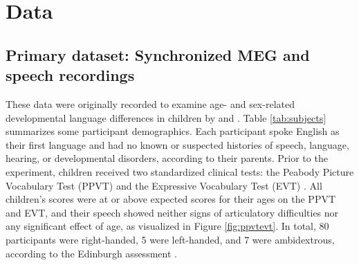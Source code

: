 \documentclass[utf8]{frontiersSCNS} %
\begin{document}



\section{Data}

\subsection{Primary dataset: Synchronized MEG and speech recordings}

These data were originally recorded to examine age- and sex-related developmental language differences in children by \cite{Doesburg2016} and \cite{Yu2014}. Table \ref{tab:subjects} summarizes some participant demographics. Each participant spoke English as their first language and had no known or suspected histories of speech, language, hearing, or developmental disorders, according to their parents. Prior to the experiment, children received two standardized clinical tests: the Peabody Picture Vocabulary Test (PPVT) \cite{Dunn97} and the Expressive Vocabulary Test (EVT) \cite{EVT}. All children's scores were at or above expected scores for their ages on the PPVT and EVT, and their speech showed neither signs of articulatory difficulties nor any significant effect of age, as visualized in Figure \ref{fig:ppvtevt}. In total, 80 participants were right-handed, 5 were left-handed, and 7 were ambidextrous, according to the Edinburgh assessment \cite{Oldfield}. %
\end{document}
